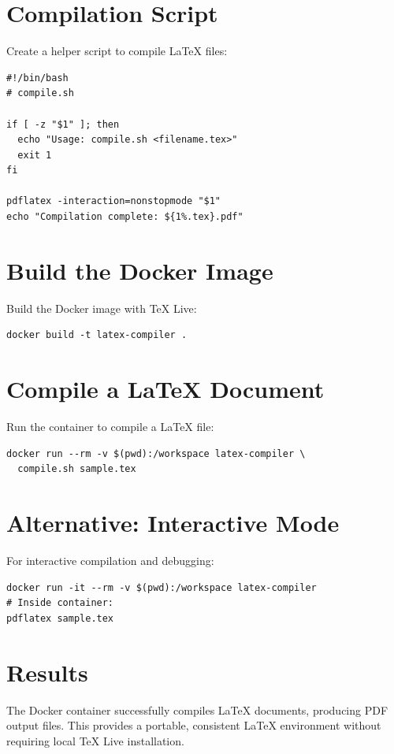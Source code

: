 \section{Compilation Script}
Create a helper script to compile \LaTeX{} files:

\begin{verbatim}
#!/bin/bash
# compile.sh

if [ -z "$1" ]; then
  echo "Usage: compile.sh <filename.tex>"
  exit 1
fi

pdflatex -interaction=nonstopmode "$1"
echo "Compilation complete: ${1%.tex}.pdf"
\end{verbatim}

\section{Build the Docker Image}
Build the Docker image with TeX Live:

\begin{verbatim}
docker build -t latex-compiler .
\end{verbatim}

\section{Compile a LaTeX Document}
Run the container to compile a \LaTeX{} file:

\begin{verbatim}
docker run --rm -v $(pwd):/workspace latex-compiler \
  compile.sh sample.tex
\end{verbatim}

\section{Alternative: Interactive Mode}
For interactive compilation and debugging:

\begin{verbatim}
docker run -it --rm -v $(pwd):/workspace latex-compiler
# Inside container:
pdflatex sample.tex
\end{verbatim}

\section{Results}
The Docker container successfully compiles \LaTeX{} documents, producing PDF output files. This provides a portable, consistent \LaTeX{} environment without requiring local TeX Live installation.